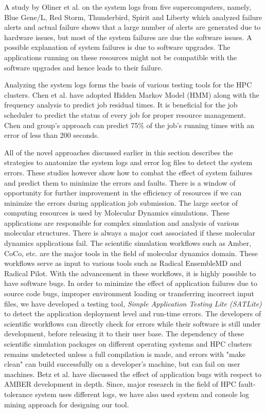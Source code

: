 \documentclass[10pt]{ruthesis}
\begin{document}
A study by Oliner et al. \cite{ref14} on the system logs from five supercomputers, namely, Blue Gene/L, Red Storm, Thunderbird, Spirit and Liberty which analyzed failure alerts and actual failure shows that a large number of alerts are generated due to hardware issues, but most of the system failures are due the software issues. A possible explanation of system failures is due to software upgrades. The applications running on these resources might not be compatible with the software upgrades and hence leads to their failure. 

Analyzing the system logs forms the basis of various testing tools for the HPC clusters. Chen et al. \cite{ref10} have adopted Hidden Markov Model (HMM) \cite{ref11} along with the frequency analysis to predict job residual times. It is beneficial for the job scheduler to predict the status of every job for proper resource management. Chen and group's approach can predict 75\% of the job's running times with an error of less than 200 seconds.  

All of the novel approaches discussed earlier in this section describes the strategies to anatomize the system logs and error log files to detect the system errors. These studies however show how to combat the effect of system failures and predict them to minimize the errors and faults. There is a window of opportunity for further improvement in the efficiency of resources if we can minimize the errors during application job submission. The large sector of computing resources is used by Molecular Dynamics simulations. These applications are responsible for complex simulation and analysis of various molecular structures. There is always a major cost associated if these molecular dynamics applications fail. The scientific simulation workflows such as Amber, CoCo, etc. are the major tools in the field of molecular dynamics domain. These workflows serve as input to various tools such as Radical EnsembleMD and Radical Pilot. With the advancement in these workflows, it is highly possible to have software bugs. In order to minimize the effect of application failures due to source code bugs, improper environment loading or transferring incorrect input files, we have developed a testing tool, \textit{Simple Application Testing Lite (SATLite)} to detect the application deployment level and run-time errors. The developers of scientific workflows can directly check for errors while their software is still under development, before releasing it to their user base. The dependency of these scientific simulation packages on different operating systems and HPC clusters remains undetected unless a full compilation is made, and errors with "make clean" \cite{ref16} can build successfully on a developer's machine, but can fail on user machines. Betz et al. \cite{ref16} have discussed the effect of application bugs with respect to AMBER development in depth. Since, major research in the field of HPC fault-tolerance system uses different logs, we have also used system and console log mining approach for designing our tool. 
\end{document}
